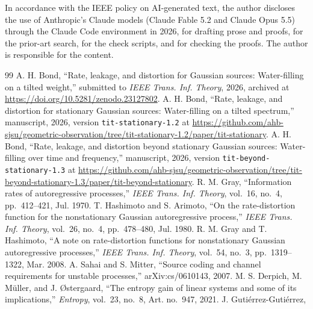 \documentclass[11pt,onecolumn]{IEEEtran}
\begin{document}
In accordance with the IEEE policy on AI-generated text, the author
discloses the use of Anthropic's Claude models (Claude Fable 5.2 and
Claude Opus 5.5) through the Claude Code environment in 2026, for
drafting prose and proofs, for the prior-art search, for the check
scripts, and for checking the proofs. The author is responsible for the
content.

\begin{thebibliography}{99}
 A. H. Bond, ``Rate, leakage, and distortion for Gaussian
sources: Water-filling on a tilted weight,'' submitted to \emph{IEEE
Trans. Inf. Theory}, 2026, archived at
\url{https://doi.org/10.5281/zenodo.23127802}.
 A. H. Bond, ``Rate, leakage, and distortion for
stationary Gaussian sources: Water-filling on a tilted spectrum,''
manuscript, 2026, version \texttt{tit-stationary-1.2} at
\url{https://github.com/ahb-sjsu/geometric-observation/tree/tit-stationary-1.2/paper/tit-stationary}.
 A. H. Bond, ``Rate, leakage, and distortion beyond
stationary Gaussian sources: Water-filling over time and frequency,''
manuscript, 2026, version \texttt{tit-beyond-stationary-1.3} at
\url{https://github.com/ahb-sjsu/geometric-observation/tree/tit-beyond-stationary-1.3/paper/tit-beyond-stationary}.
 R. M. Gray, ``Information rates of autoregressive
processes,'' \emph{IEEE Trans. Inf. Theory}, vol.~16, no.~4,
pp.~412--421, Jul. 1970.
 T. Hashimoto and S. Arimoto, ``On the
rate-distortion function for the nonstationary Gaussian autoregressive
process,'' \emph{IEEE Trans. Inf. Theory}, vol.~26, no.~4,
pp.~478--480, Jul. 1980.
 R. M. Gray and T. Hashimoto, ``A note on
rate-distortion functions for nonstationary Gaussian autoregressive
processes,'' \emph{IEEE Trans. Inf. Theory}, vol.~54, no.~3,
pp.~1319--1322, Mar. 2008.
 A. Sahai and S. Mitter, ``Source coding and channel
requirements for unstable processes,'' arXiv:cs/0610143, 2007.
 M. S. Derpich, M. M\"uller, and J. \O stergaard,
``The entropy gain of linear systems and some of its implications,''
\emph{Entropy}, vol.~23, no.~8, Art. no.~947, 2021.
 J. Guti\'errez-Guti\'errez,

\end{thebibliography}
\end{document}
